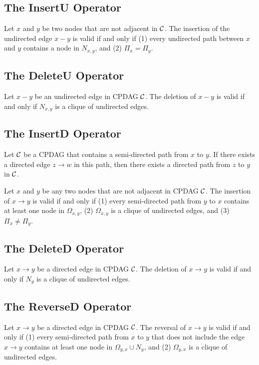 \subsection{The InsertU Operator}
\begin{theorem}
    Let $x$ and $y$ be two nodes that are not adjacent in $\mathcal{C}$. The insertion of the undirected edge $x - y$ is valid if and only if (1) every undirected path between $x$ and $y$ contains a node in $N_{x,y}$, and (2) $\Pi_x = \Pi_y$.
\end{theorem}

\subsection{The DeleteU Operator}
\begin{theorem}
    Let $x - y$ be an undirected edge in CPDAG $\mathcal{C}$. The deletion of $x - y$ is valid if and only if $N_{x,y}$ is a clique of undirected edges.
\end{theorem}

\subsection{The InsertD Operator}
\begin{lemma}
    Let $\mathcal{C}$ be a CPDAG that contains a semi-directed path from $x$ to $y$. If there exists a directed edge $z \rightarrow w$ in this path, then there exists a directed path from $z$ to $y$ in $\mathcal{C}$.
\end{lemma}

\begin{theorem}
    Let $x$ and $y$ be any two nodes that are not adjacent in CPDAG $\mathcal{C}$. The insertion of $x \rightarrow y$ is valid if and only if (1) every semi-directed path from $y$ to $x$ contains at least one node in $\Omega_{x,y}$, (2) $\Omega_{x,y}$ is a clique of undirected edges, and (3) $\Pi_x \ne \Pi_y$.
\end{theorem}

\subsection{The DeleteD Operator}
\begin{theorem}
    Let $x \rightarrow y$ be a directed edge in CPDAG $\mathcal{C}$. The deletion of $x \rightarrow y$ is valid if and only if $N_y$ is a clique of undirected edges.
\end{theorem}

\subsection{The ReverseD Operator}
\begin{theorem}
    Let $x \rightarrow y$ be a directed edge in CPDAG $\mathcal{C}$. The reversal of $x \rightarrow y$ is valid if and only if (1) every semi-directed path from $x$ to $y$ that does not include the edge $x \rightarrow y$ contains at least one node in $\Omega_{y,x} \cup N_y$, and (2) $\Omega_{y,x}$ is a clique of undirected edges.
\end{theorem}

